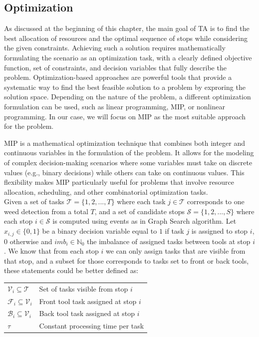 \subsection{Optimization}
As discussed at the beginning of this chapter, the main goal of \ac{TA} is to find the best allocation of resources and the optimal sequence of stops while considering the given constraints. Achieving such a solution requires mathematically formulating the scenario as an optimization task, with a clearly defined objective function, set of constraints, and decision variables that fully describe the problem. Optimization-based approaches are powerful tools that provide a systematic way to find the best feasible solution to a problem by exproring the solution space. Depending on the nature of the problem, a different optimization formulation can be used, such as linear programming, \ac{MIP}, or nonlinear programming. In our case, we will focus on \ac{MIP} as the most suitable approach for the problem.

\ac{MIP} is a mathematical optimization technique that combines both integer and continuous variables in the formulation of the problem. It allows for the modeling of complex decision-making scenarios where some variables must take on discrete values (e.g., binary decisions) while others can take on continuous values. This flexibility makes \ac{MIP} particularly useful for problems that involve resource allocation, scheduling, and other combinatorial optimization tasks. \\

Given a set of tasks $\mathcal{T} = \{1,2,...,T\}$ where each task $j \in \mathcal{T}$ corresponds to one weed detection from a total $T$, and a set of candidate stops $\mathcal{S} = \{1,2,...,S\}$ where each stop $i \in \mathcal{S}$ is computed using events as in Graph Search algorithm. Let $x_{i,j} \in \{0,1\} $ be a binary decision variable equal to $1$ if task $j$ is assigned to stop $i$, $0$ otherwise and ${imb}_i \in \mathbb{N}_0$ the imbalance of assigned tasks between tools at stop $i$. We know that from each stop $i$ we can only assign tasks that are visible from that stop, and a subset for those corresponds to tasks set to front or back tools, these statements could be better defined as:

\begin{tabular}{ll}
    $\mathcal{V}_i \subseteq \mathcal{T}$ & Set of tasks visible from stop $i$ \\
    $\mathcal{F}_i \subseteq \mathcal{V}_i$ & Front tool task assigned at stop $i$ \\
    $\mathcal{B}_i \subseteq \mathcal{V}_i$ & Back tool task assigned at stop $i$ \\
    $\tau$ & Constant processing time per task \\
\end{tabular}

